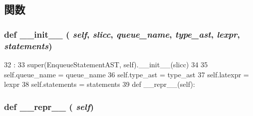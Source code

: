 \subsection{関数}
\hypertarget{classslicc_1_1ast_1_1EnqueueStatementAST_1_1EnqueueStatementAST_ac775ee34451fdfa742b318538164070e}{
\subsubsection[{\_\-\_\-init\_\-\_\-}]{\setlength{\rightskip}{0pt plus 5cm}def \_\-\_\-init\_\-\_\- ( {\em self}, \/   {\em slicc}, \/   {\em queue\_\-name}, \/   {\em type\_\-ast}, \/   {\em lexpr}, \/   {\em statements})}}
\label{classslicc_1_1ast_1_1EnqueueStatementAST_1_1EnqueueStatementAST_ac775ee34451fdfa742b318538164070e}



\begin{DoxyCode}
32                                                                       :
33         super(EnqueueStatementAST, self).__init__(slicc)
34 
35         self.queue_name = queue_name
36         self.type_ast = type_ast
37         self.latexpr = lexpr
38         self.statements = statements
39 
    def __repr__(self):
\end{DoxyCode}
\hypertarget{classslicc_1_1ast_1_1EnqueueStatementAST_1_1EnqueueStatementAST_ad8b9328939df072e4740cd9a63189744}{
\subsubsection[{\_\-\_\-repr\_\-\_\-}]{\setlength{\rightskip}{0pt plus 5cm}def \_\-\_\-repr\_\-\_\- ( {\em self})}}
\label{classslicc_1_1ast_1_1EnqueueStatementAST_1_1EnqueueStatementAST_ad8b9328939df072e4740cd9a63189744}



